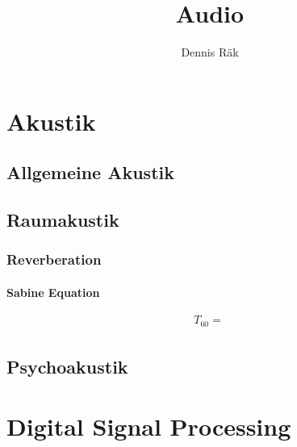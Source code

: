 \documentclass[12pt,a4paper]{report}
\begin{document}
    \title{Audio}
    \author{Dennis Räk}
    \date{}
    \maketitle

\chapter{Akustik}
    \section{Allgemeine Akustik}
    \section{Raumakustik}
        \subsection{Reverberation}
            \subsubsection{Sabine Equation}
            $$T_{60} = \frac{}{}$$
    \section{Psychoakustik}

\chapter{Digital Signal Processing}
\end{document}

